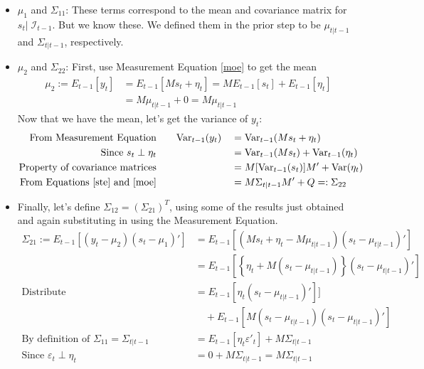\documentclass[a4paper,12pt]{article}
\begin{document}
\begin{itemize}
  \item $\mu_1$ and $\Sigma_{11}$: These terms correspond
    to the mean and covariance matrix for $s_t |\;
    \mathcal{I}_{t-1}$. But we know these. We defined them
    in the prior step to be $\mu_{t|t-1}$ and
    $\Sigma_{t|t-1}$, respectively. 

  \item $\mu_2$ and $\Sigma_{22}$: First, use Measurement
    Equation \ref{moe} to get the mean
    \begin{align*}
      \mu_2 := E_{t-1}[y_t ] &= 
        E_{t-1}[Ms_t + \eta_t ] =
        ME_{t-1}[s_t] 
        + E_{t-1}[\eta_t ]\\
        &= M \mu_{t|t-1} + 0 = M\mu_{t|t-1}
    \end{align*}
    Now that we have the mean, let's get the variance of $y_t$: 
    \begin{alignat*}{2}
      \text{From Measurement Equation} &\qquad
        \text{Var}_{t-1}(y_t) 
        &&= \text{Var}_{t-1}(Ms_t + \eta_t) \\
      \text{Since $s_t\perp\eta_t$} &\qquad 
        &&= \text{Var}_{t-1}(Ms_t) 
        + \text{Var}_{t-1}(\eta_t)\\
      \text{Property of covariance matrices} &\qquad 
        &&= M [\text{Var}_{t-1}(s_t)] M' 
        + \text{Var}(\eta_t) \\
      \text{From Equations \ref{ste} and \ref{moe}} &\qquad 
        &&= M\Sigma_{t|t-1} M' + Q =: \Sigma_{22}
    \end{alignat*}
    
  \item Finally, let's define $\Sigma_{12} =
    (\Sigma_{21})^T$, using some of the results just
    obtained and again substituting in using the
    Measurement Equation.
    \begin{align*}
      \Sigma_{21} := E_{t-1}\left[(y_t-\mu_2)(s_t - \mu_1)'
        \right] &= 
        E_{t-1}\left[(Ms_t+\eta_t-M\mu_{t|t-1})(s_t-\mu_{t|t-1})'
        \right]  \\
      &= E_{t-1}\left[\left\{\eta_t+ M(s_t-\mu_{t|t-1})\right\}
        (s_t-\mu_{t|t-1})' \right]  \\
      \text{Distribute}
      \qquad
      &= E_{t-1}\left[\eta_t(s_t-\mu_{t|t-1})'\right]]\\
      &\quad + E_{t-1}\left[M(s_t-\mu_{t|t-1})
        (s_t-\mu_{t|t-1})'\right]  \\
      \text{By definition of $\Sigma_{11}=\Sigma_{t|t-1}$}
      \qquad
      &= E_{t-1}\left[\eta_t\varepsilon'_t\right]
        + M\Sigma_{t|t-1} \\
      \text{Since $\varepsilon_t\perp \eta_t$} \qquad
      &= 0 + M\Sigma_{t|t-1}  = M\Sigma_{t|t-1} 
    \end{align*}
\end{itemize}
\end{document}
